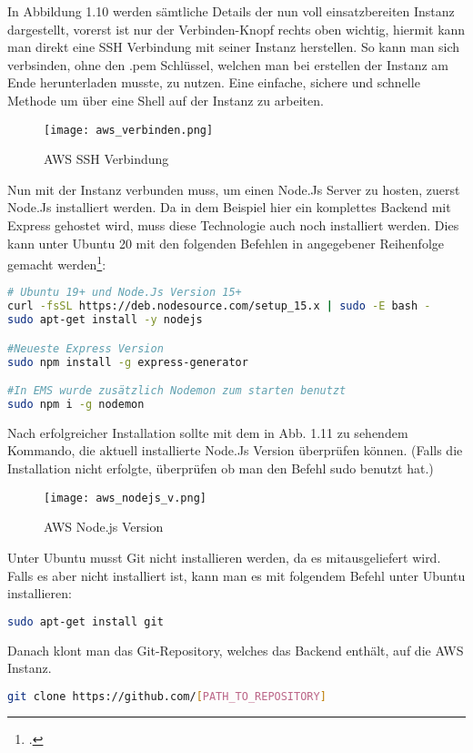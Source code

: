 In Abbildung 1.10 werden sämtliche Details der nun voll einsatzbereiten Instanz dargestellt, vorerst ist nur der Verbinden-Knopf rechts oben wichtig, hiermit kann man direkt eine SSH Verbindung mit seiner Instanz herstellen. So kann man sich verbsinden, ohne den .pem Schlüssel, welchen man bei erstellen der Instanz am Ende herunterladen musste, zu nutzen. Eine einfache, sichere und schnelle Methode um über eine Shell auf der Instanz zu arbeiten.
\begin{center}
\begin{figure}[H]
    \centering
    \texttt{[image: aws\_verbinden.png]}
    \caption{AWS SSH Verbindung}
\end{figure}
\end{center}
Nun mit der Instanz verbunden muss, um einen Node.Js Server zu hosten, zuerst Node.Js installiert werden. Da in dem Beispiel hier ein komplettes Backend mit Express gehostet wird, muss diese Technologie auch noch installiert werden. Dies kann unter Ubuntu 20 mit den folgenden Befehlen in angegebener Reihenfolge gemacht werden\footcite{deploy-nodejs1}:
\begin{lstlisting}[language=bash]
# Ubuntu 19+ und Node.Js Version 15+
curl -fsSL https://deb.nodesource.com/setup_15.x | sudo -E bash -
sudo apt-get install -y nodejs

#Neueste Express Version
sudo npm install -g express-generator

#In EMS wurde zusätzlich Nodemon zum starten benutzt
sudo npm i -g nodemon
\end{lstlisting}
Nach erfolgreicher Installation sollte mit dem in Abb. 1.11 zu sehendem Kommando, die aktuell installierte Node.Js Version überprüfen können. (Falls die Installation nicht erfolgte, überprüfen ob man den Befehl sudo benutzt hat.)
\begin{center}
\begin{figure}[H]
    \centering
    \texttt{[image: aws\_nodejs\_v.png]}
    \caption{AWS Node.js Version}
\end{figure}
\end{center}
Unter Ubuntu musst Git nicht installieren werden, da es mitausgeliefert wird. Falls es aber nicht installiert ist, kann man es mit folgendem Befehl unter Ubuntu installieren:
\begin{lstlisting}[language=bash]
sudo apt-get install git
\end{lstlisting}
Danach klont man das Git-Repository, welches das Backend enthält, auf die AWS Instanz.
\begin{lstlisting}[language=bash]
git clone https://github.com/[PATH_TO_REPOSITORY]
\end{lstlisting}
